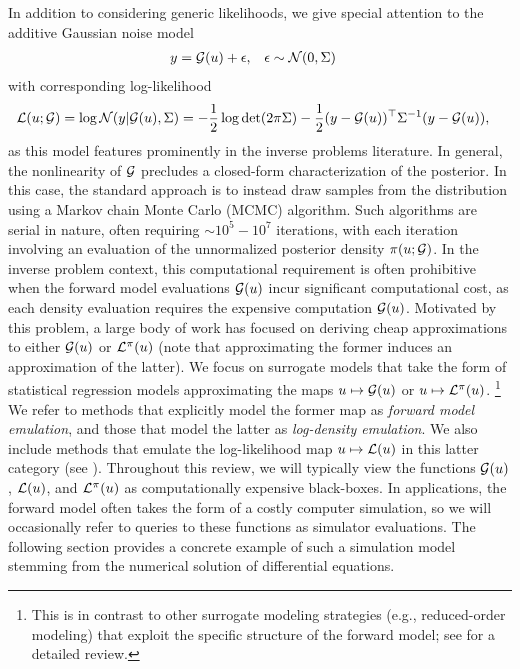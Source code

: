 \documentclass[12pt]{article}
\begin{document}
In addition to considering 
generic likelihoods, we give special attention to the additive Gaussian noise model
\begin{align}
&y = \mathcal{G}(u) + \epsilon,
&&\epsilon \sim \mathcal{N}(0, \Sigma) \label{inv_prob_Gaussian} 
\end{align}
with corresponding log-likelihood 
\begin{align}
\mathcal{L}(u; \mathcal{G}) &= \log\mathcal{N}(y| \mathcal{G}(u), \Sigma) 
= -\frac{1}{2} \log\det (2\pi \Sigma) - \frac{1}{2} (y - \mathcal{G}(u))^\top \Sigma^{-1} (y - \mathcal{G}(u)), \label{llik_Gaussian}
\end{align}
as this model features prominently in the inverse problems literature.
In general, the nonlinearity of $\mathcal{G}$ precludes a closed-form characterization of the posterior. In this case, the 
standard approach is to instead draw samples from the distribution using a Markov chain Monte Carlo (MCMC) 
algorithm. Such algorithms are serial in nature, often requiring $\sim 10^5 - 10^7$ iterations, with each 
iteration involving an evaluation of the unnormalized posterior density $\pi(u; \mathcal{G})$. 
In the inverse problem context, this computational requirement is often prohibitive when the forward model 
evaluations $\mathcal{G}(u)$ incur significant computational cost, as each density evaluation requires the 
expensive computation $\mathcal{G}(u)$. Motivated by this problem, a large body of work has focused on deriving 
cheap approximations to either $\mathcal{G}(u)$ or $\mathcal{L}^{\pi}(u)$ (note that approximating the former induces 
an approximation of the latter). We focus on surrogate models that take the form of statistical 
regression models approximating the maps $u \mapsto \mathcal{G}(u)$ or $u \mapsto \mathcal{L}^{\pi}(u)$.
\footnote{This is in contrast to other surrogate modeling strategies (e.g., reduced-order modeling)
that exploit the specific structure of the forward model; see \citet{multifidelityReview} for a detailed review.}
We refer to methods that explicitly model the former map as \textit{forward model emulation}, and those that 
model the latter as \textit{log-density emulation}. We also include methods that emulate the log-likelihood
map $u \mapsto \mathcal{L}(u)$ in this latter category (see ).
Throughout this review, we will typically view the functions
$\mathcal{G}(u)$, $\mathcal{L}(u)$, and $\mathcal{L}^{\pi}(u)$ as computationally expensive black-boxes. In applications,
the forward model often takes the form of a costly computer simulation, so we will occasionally refer to 
queries to these functions as simulator evaluations.
The following section provides a concrete example of such a simulation
model stemming from the numerical solution of differential equations. 
 
\end{document}
